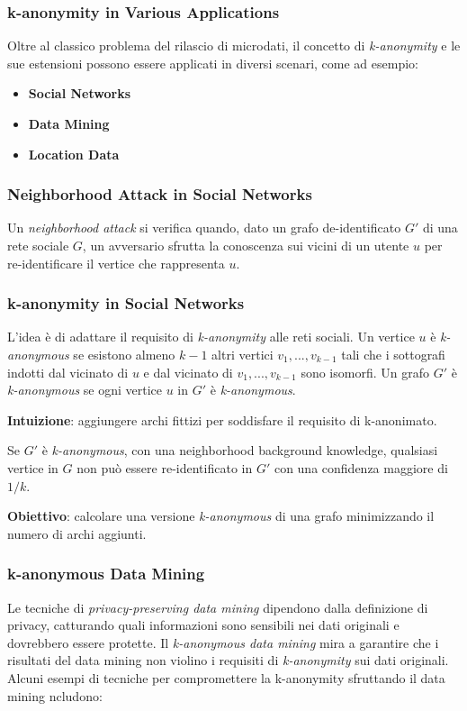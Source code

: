 \documentclass{report}
\begin{document}
\subsubsection{ k-anonymity in Various Applications}
Oltre al classico problema del rilascio di microdati, il concetto di \textit{k-anonymity} e le sue estensioni possono essere applicati in diversi scenari, come ad esempio:

\begin{itemize}
    \item \textbf{Social Networks}
    \item \textbf{Data Mining}
    \item \textbf{Location Data}
\end{itemize}

\subsubsection{ Neighborhood Attack in Social Networks}
Un \textit{neighborhood attack} si verifica quando, dato un grafo de-identificato $G'$ di una rete sociale $G$, un avversario sfrutta la conoscenza sui vicini di un utente $u$ per re-identificare il vertice che rappresenta $u$. 

\subsubsection{k-anonymity in Social Networks}
L'idea è di adattare il requisito di \textit{k-anonymity} alle reti sociali. 
Un vertice $u$ è \textit{k-anonymous} se esistono almeno $k-1$ altri vertici $v_1, ..., v_{k-1}$ tali che i sottografi indotti dal vicinato di $u$ e dal vicinato di $v_1, ..., v_{k-1}$ sono isomorfi. 
Un grafo $G'$ è \textit{k-anonymous} se ogni vertice $u$ in $G'$ è \textit{k-anonymous}. 

\noindent \textbf{Intuizione}: aggiungere archi fittizi per soddisfare il requisito di k-anonimato.

\noindent Se $G'$ è \textit{k-anonymous}, con una neighborhood background knowledge, qualsiasi vertice in $G$ non può essere re-identificato in $G'$ con una confidenza maggiore di $1/k$.

\noindent \textbf{Obiettivo}: calcolare una versione \textit{k-anonymous} di una grafo minimizzando il numero di archi aggiunti.

\subsubsection{ k-anonymous Data Mining}
Le tecniche di \textit{privacy-preserving data mining} dipendono dalla definizione di privacy, catturando quali informazioni sono sensibili nei dati originali e dovrebbero essere protette. 
Il \textit{k-anonymous data mining} mira a garantire che i risultati del data mining non violino i requisiti di \textit{k-anonymity} sui dati originali.
Alcuni esempi di tecniche per compromettere la k-anonymity sfruttando il data mining ncludono:
\end{document}
